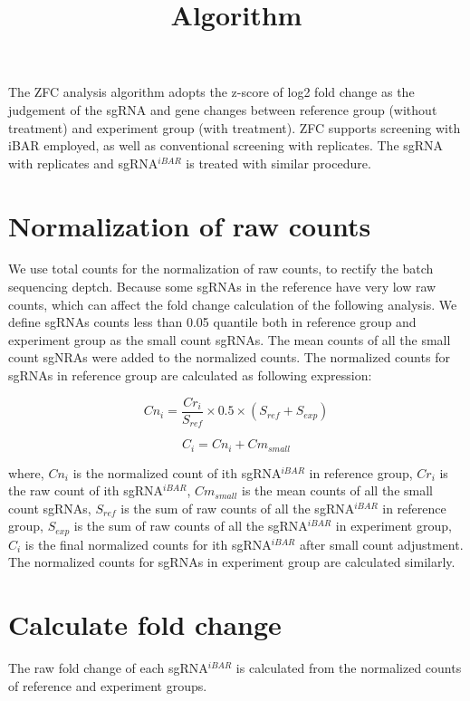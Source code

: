 \documentclass[11pt, a4paper]{article}
\title{Algorithm}
\begin{document}
\maketitle

The ZFC analysis algorithm adopts the z-score of log2 fold change as
the judgement of the sgRNA and gene changes between reference group
(without treatment) and experiment group (with treatment). ZFC
supports screening with iBAR \citep{zhu_guide_2019} employed, as
well as conventional screening with replicates. The sgRNA with
replicates and sgRNA$^{iBAR}$ is treated with similar procedure.

\section{Normalization of raw counts}

We use total counts for the normalization of raw counts, to rectify
the batch sequencing deptch. Because some sgRNAs in the reference have
very low raw counts, which can affect the fold change calculation of
the following analysis. We define sgRNAs counts less than 0.05
quantile both in reference group and experiment group as the small
count sgRNAs. The mean counts of all the small count sgNRAs were added
to the normalized counts. The normalized counts for sgRNAs in
reference group are calculated as following expression:

$$Cn_{i} = \frac{Cr_{i}}{S_{ref}} \times 0.5 \times (S_{ref} + S_{exp})$$

$$C_{i} = Cn_{i} + Cm_{small}$$

where, $Cn_{i}$ is the normalized count of ith sgRNA$^{iBAR}$ in
reference group, $Cr_{i}$ is the raw count of ith sgRNA$^{iBAR}$,
$Cm_{small}$ is the mean counts of all the small count sgRNAs,
$S_{ref}$ is the sum of raw counts of all the sgRNA$^{iBAR}$ in
reference group, $S_{exp}$ is the sum of raw counts of all the
sgRNA$^{iBAR}$ in experiment group, $C_{i}$ is the final normalized
counts for ith sgRNA$^{iBAR}$ after small count adjustment. The
normalized counts for sgRNAs in experiment group are calculated
similarly.

\section{Calculate fold change}

The raw fold change of each sgRNA$^{iBAR}$ is calculated from the
normalized counts of reference and experiment groups.
\end{document}
